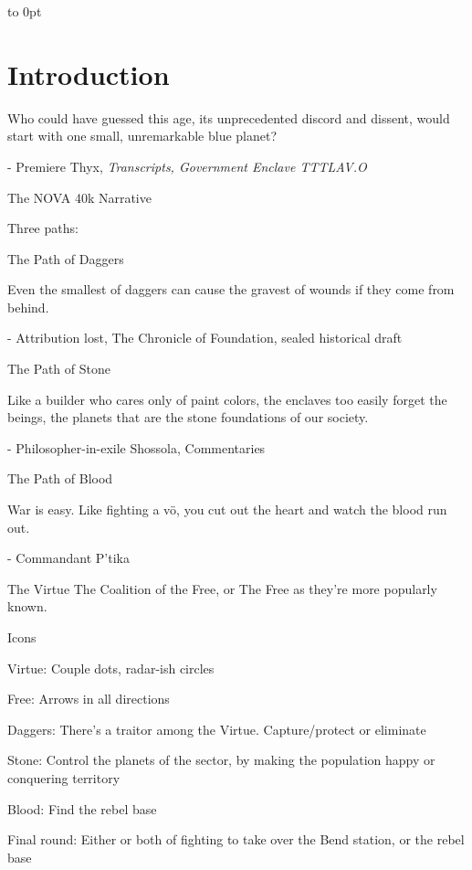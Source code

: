 \documentclass{novanarrative}
\begin{document}
\squelchbackground


\pagebreak
\thispagestyle{empty}
\vbox to 0pt{}
\pagebreak

\restorebackground
\setcounter{page}{55}
\chapter{Introduction}

Who could have guessed this age, its unprecedented discord and
dissent, would start with one small, unremarkable blue planet?

- Premiere Thyx, \textit{Transcripts, Government Enclave TTTLAV.O}




The NOVA 40k Narrative


Three paths:

The Path of Daggers

Even the smallest of daggers can cause the gravest of wounds if they
come from behind.

- Attribution lost, The Chronicle of Foundation, sealed historical draft


The Path of Stone

Like a builder who cares only of paint colors, the enclaves too easily
forget the beings, the planets that are the stone foundations of our
society.

- Philosopher-in-exile Shossola, Commentaries


The Path of Blood

War is easy.  Like fighting a v\"o, you cut out the heart and watch
the blood run out.

- Commandant P'tika





The Virtue
The Coalition of the Free, or The Free as they're more popularly known.

Icons

Virtue: Couple dots, radar-ish circles

Free: Arrows in all directions


Daggers: There's a traitor among the Virtue.  Capture/protect or eliminate

Stone: Control the planets of the sector, by making the population happy or
conquering territory

Blood: Find the rebel base


Final round: Either or both of fighting to take over the Bend station,
or the rebel base
\end{document}
